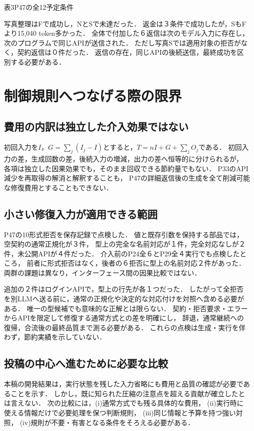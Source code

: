\documentclass[uplatex,a4paper,twocolumn,10pt]{jsarticle}
\begin{document}
\begin{center}
\begin{minipage}{\columnwidth}\centering
\small 表3\quad P47の全12予定条件\par\smallskip
\EvidencePFortySevenTasks
\end{minipage}
\end{center}

写真整理はFで成功し，NとSで未達だった．
返金は３条件で成功したが，SもFより15,040 token多かった．
全体で付加した６返信は次のモデル入力に存在し，
次のプログラムで同じAPIが送信された．
ただし写真Sでは適用対象の拒否がなく，契約返信は０件だった．
返信の存在，同じAPIの後続送信，最終成功を区別する必要がある．

\clearpage
\section{制御規則へつなげる際の限界}
\subsection{費用の内訳は独立した介入効果ではない}
初回入力を$I$，$G=\sum_j(I_j-I)$とすると，$T=nI+G+\sum_jO_j$である．
初回入力の差，生成回数の差，後続入力の増減，出力の差へ恒等的に分けられるが，
各項は独立した因果効果でも，そのまま回収できる節約量でもない．
P33のAPI減少を再取得の解消と解釈することも，
P47の詳細返信後の生成を全て削減可能な修復費用とすることもできない．

\subsection{小さい修復入力が適用できる範囲}
P47の10形式拒否を保存記録で点検した．
値と既存引数を保持する部品では，空契約の通常正規化が３件，
型上の完全な名前対応が１件，完全対応なしが２件，未公開APIが４件だった．
介入前のP24全６とP29全４実行でも点検したところ，
前者に形式拒否はなく，後者の６拒否に型上の名前対応２件があった．
両群の課題は異なり，インターフェース間の因果比較ではない．

追加の２件はログインAPIで，型上の行先が各１つだった．
したがって全拒否を別LLMへ送る前に，通常の正規化や決定的な対応付けを対照へ含める必要がある．
唯一の型候補でも意味的な正解とは限らない．
契約・拒否要求・エラーからAPIを限定して修復する通常方式\cite{schema}との差を明確にし，
辞退，通常継続への復帰，合流後の最終品質まで測る必要がある．
これらの点検は生成・実行を伴わず，節約実績を示していない．

\newpage
\subsection{投稿の中心へ進むために必要な比較}
本稿の開発結果は，実行状態を残した入力省略にも費用と品質の確認が必要であることを示す．
しかし，既に知られた圧縮の注意点を超える貢献が確立したとは言えない．
次の比較には，(i)通常方式でも残る具体的な費用，
(ii)実行時に使える情報だけで必要処理を保つ判断規則，
(iii)同じ情報と予算を持つ強い対照，
(iv)規則が不要・有害となる条件をそろえる必要がある．
\end{document}
